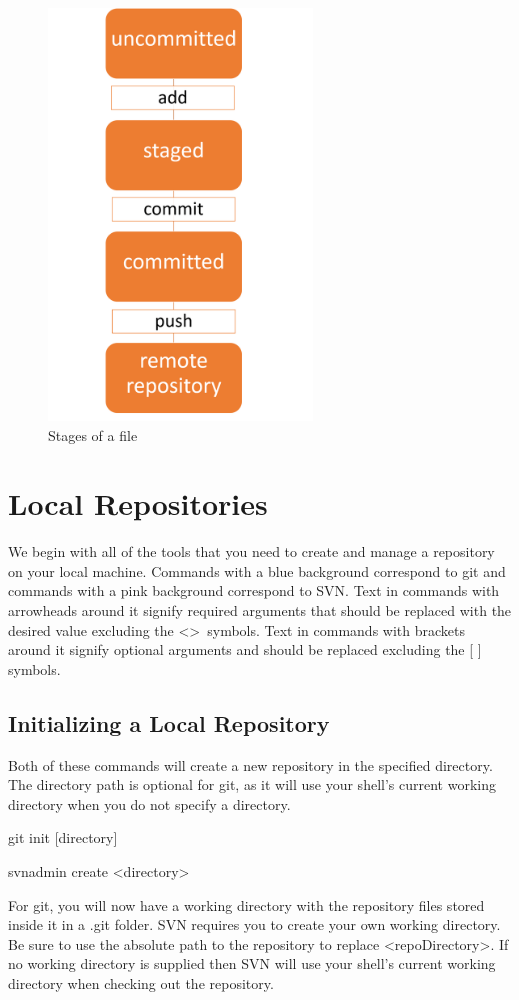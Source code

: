 \documentclass[oneside]{book}
\begin{document}
\begin{figure}[ht!]
	\centering
	\includegraphics[width=70mm]{introduction.png}
	\caption{Stages of a file} 
\end{figure}


\chapter{Local Repositories}
We begin with all of the tools that you need to create and manage a repository on your local machine. Commands with a blue background correspond to git and commands with a pink background correspond to SVN. Text in commands with arrowheads around it signify required arguments that should be replaced with the desired value excluding the \textless \textgreater\  symbols. Text in commands with brackets around it signify optional arguments and should be replaced excluding the [ ] symbols.  
\section{Initializing a Local Repository}
Both of these commands will create a new repository in the specified directory. The directory path is optional for git, as it will use your shell's current working directory when you do not specify a directory.
    \begin{gitcode}
    git init [directory]
    \end{gitcode}
    \begin{svncode}
    svnadmin create <directory>
    \end{svncode}
For git, you will now have a working directory with the repository files stored inside it in a .git folder. SVN requires you to create your own working directory. Be sure to use the absolute path to the repository to replace \textless repoDirectory\textgreater. If no working directory is supplied then SVN will use your shell's current working directory when checking out the repository.  
\end{document}
